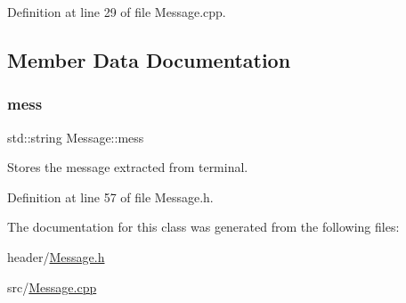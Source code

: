Definition at line 29 of file Message.\+cpp.



\subsection{Member Data Documentation}
\mbox{\label{classMessage_a71af4fd1655feab5f4986782f9c1bc92}} 
\subsubsection{\texorpdfstring{mess}{mess}}
{\footnotesize\ttfamily std\+::string Message\+::mess\hspace{0.3cm}{\ttfamily [private]}}

Stores the message extracted from terminal. 

Definition at line 57 of file Message.\+h.



The documentation for this class was generated from the following files\+:\begin{DoxyCompactItemize}
\item 
header/\mbox{\hyperlink{Message_8h}{Message.\+h}}\item 
src/\mbox{\hyperlink{Message_8cpp}{Message.\+cpp}}\end{DoxyCompactItemize}
